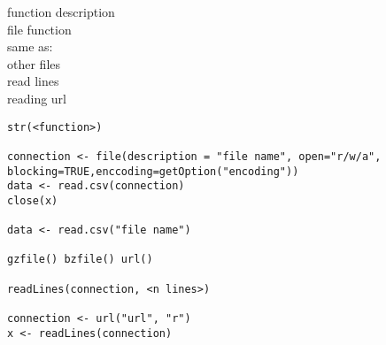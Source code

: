 \documentclass[12pt,a4paper]{report}
\begin{document}
\begin{tcolorbox}[colback=pageyl,colframe=pagebl,title= R \hfill File connection,coltitle=Magenta,fonttitle=\bfseries,coltext=Black,width=0.9\paperwidth,boxrule=2mm]\colorbox{pageyl}{\noindent\begin{minipage}[t]{0.3\textwidth}\sffamily \color{ctnb}\vspace{\baselineskip}
function description\\[\baselineskip]
file function\\[4\baselineskip]
same as:\\[\baselineskip]
other files\\[\baselineskip]
read lines\\[\baselineskip]
reading url
\end{minipage}}\qquad\begin{minipage}[t]{0.672\textwidth}
{\begin{lstlisting}[frame=single,framerule=0pt, numbers=none, numbersep=10pt, aboveskip=20pt,belowskip=20pt]
str(<function>)

connection <- file(description = "file name", open="r/w/a", 
blocking=TRUE,enccoding=getOption("encoding"))
data <- read.csv(connection)
close(x)

data <- read.csv("file name")

gzfile() bzfile() url()

readLines(connection, <n lines>)

connection <- url("url", "r")
x <- readLines(connection)
\end{lstlisting}}\end{minipage}\end{tcolorbox}
\end{document}
